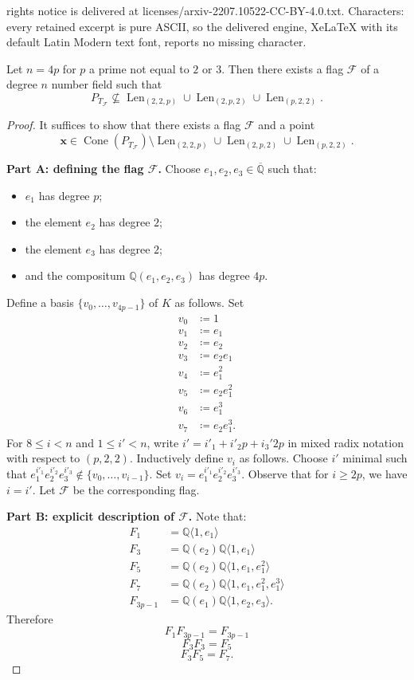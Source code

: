 \documentclass[10pt,a4paper]{amsart}
\DeclareMathOperator{\Cone}{Cone}
\DeclareMathOperator{\Len}{Len}
\newcommand{\QQ}{\mathbb{Q}}      %
\newcommand{\cF}{\mathcal{F}}
\newcommand{\la}{\langle}
\newcommand{\ra}{\rangle}
\begin{document}
rights notice is delivered at licenses/arxiv-2207.10522-CC-BY-4.0.txt. Characters: every retained excerpt is pure ASCII, so the delivered engine, XeLaTeX with its default Latin Modern text font, reports no missing character.
\begin{proposition}
\label{lem:4p}
Let $n = 4p$ for $p$ a prime not equal to $2$ or $3$. Then there exists a flag $\cF$ of a degree $n$ number field such that 
\[
	P_{T_{\cF}} \not \subseteq \Len_{(2,2,p)} \cup \Len_{(2,p,2)} \cup \Len_{(p,2,2)}.
\]
\end{proposition}

\begin{proof}
It suffices to show that there exists a flag $\cF$ and a point 
\[
	\mathbf{x} \in \Cone(P_{T_{\cF}}) \setminus \Len_{(2,2,p)} \cup \Len_{(2,p,2)} \cup \Len_{(p,2,2)}.
\]

\noindent \textbf{Part A: defining the flag $\cF$.}
Choose $e_1,e_2,e_3 \in \overline{\QQ}$ such that:
\begin{itemize}
\item $e_1$ has degree $p$;
\item the element $e_2$ has degree $2$;
\item  the element $e_3$ has degree $2$;
\item and the compositum $\QQ(e_1,e_2,e_3)$ has degree $4p$. 
\end{itemize}
 
Define a basis $\{ v_0,\dots,v_{4p-1}\}$ of $K$ as follows. Set 
\begin{align*}
v_0 &\coloneqq 1 \\
v_1 &\coloneqq e_1 \\
v_2 &\coloneqq e_2 \\
v_3 &\coloneqq e_2 e_1 \\
v_4 &\coloneqq e_1^2 \\
v_5 &\coloneqq e_2 e_1^2 \\
v_6 &\coloneqq e_1^3 \\
v_7 &\coloneqq e_2e_1^3.
\end{align*}
For $8 \leq i < n$ and $1 \leq i' < n$, write $i' = i'_1 + i'_2p + i_3'2p$ in mixed radix notation with respect to $(p,2,2)$. Inductively define $v_i$ as follows. Choose $i'$ minimal such that $e_1^{i'_1}e_2^{i'_2}e_3^{i'_3} \notin \{v_0,\dots,v_{i-1}\}$. Set $v_i = e_1^{i'_1}e_2^{i'_2}e_3^{i'_3}$. Observe that for $i \geq 2p$, we have $i = i'$. Let $\cF$ be the corresponding flag.

\noindent \textbf{Part B: explicit description of $\cF$.}
Note that:
\begin{align*}
F_1 &= \QQ\la  1, e_1 \ra \\
F_3 &= \QQ( e_2) \QQ \la 1,e_1 \ra\\
F_5 &= \QQ( e_2)\QQ\la  1, e_1, e_1^2 \ra \\
F_7 &= \QQ( e_2)\QQ \la 1, e_1, e_1^2, e_1^3 \ra \\
F_{3p-1} &= \QQ( e_1 )  \QQ \la 1, e_2, e_3 \ra.
\end{align*}
Therefore
\[
	F_1F_{3p-1}  = F_{3p-1}
\]
\[
F_3F_3 = F_5
\]
\[
F_3F_5 = F_7.
\]


\end{proof}
\end{document}
